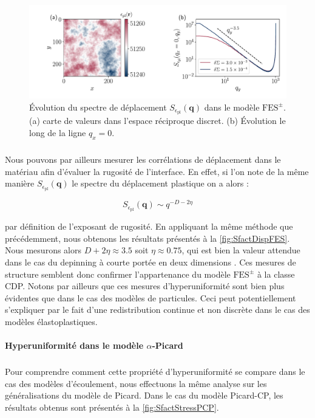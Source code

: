 \begin{figure}[h]
	\centering	\includegraphics[width=\textwidth]{Chapitre4/Figures/Correlations/Sfact_Disp_SRPNC.pdf}
	\caption{Évolution du spectre de déplacement $S_{\epsilon_\text{pl}}(\mathbf{q})$ dans le modèle $\text{FES}^\pm$. (a) carte de valeurs dans l'espace réciproque discret. (b) Évolution le long de la ligne $q_x=0$.}
	\label{fig:SfactDispFES}
\end{figure}

\subparagraph{}Nous pouvons par ailleurs mesurer les corrélations de déplacement dans le matériau afin d'évaluer la rugosité de l'interface. En effet, si l'on note de la même manière $S_{\epsilon_\text{pl}}(\mathbf{q})$ le spectre du déplacement plastique on a alors :

\begin{equation}
	S_{\epsilon_\text{pl}}(\mathbf{q}) \sim q^{-D-2\eta}
\end{equation}

\noindent par définition de l'exposant de rugosité. En appliquant la même méthode que précédemment, nous obtenons les résultats présentés à la \autoref{fig:SfactDispFES}. Nous mesurons alors $D+2\eta \approx 3.5$ soit $\eta\approx 0.75$, qui est bien la valeur attendue dans le cas du depinning à courte portée en deux dimensions \cite{semeikin_roughness_2024}. Ces mesures de structure semblent donc confirmer l'appartenance du modèle $\text{FES}^\pm$ à la classe CDP. Notons par ailleurs que ces mesures d'hyperuniformité sont bien plus évidentes que dans le cas des modèles de particules. Ceci peut potentiellement s'expliquer par le fait d'une redistribution continue et non discrète dans le cas des modèles élastoplastiques.

\paragraph{Hyperuniformité dans le modèle $\alpha$-Picard}

\subparagraph{}Pour comprendre comment cette propriété d'hyperuniformité se compare dans le cas des modèles d'écoulement, nous effectuons la même analyse sur les généralisations du modèle de Picard. Dans le cas du modèle Picard-CP, les résultats obtenus sont présentés à la \autoref{fig:SfactStressPCP}.

